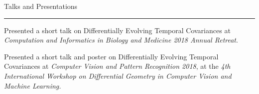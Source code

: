 \documentclass[]{article}
\begin{document}
%
%
%
%
%
%
%






\vspace{20pt}
{\LARGE Talks and Presentations}
\vspace{3pt}
\hrule
\vspace{10pt}

 Presented a short talk on Differentially Evolving Temporal Covariances at \textit{Computation and Informatics in Biology and Medicine 2018 Annual Retreat}.

 Presented a short talk and poster on Differentially Evolving Temporal Covariances at \textit{Computer Vision and Pattern Recognition 2018}, at the \textit{4th International Workshop on Differential Geometry in Computer Vision and Machine Learning.}
\end{document}
